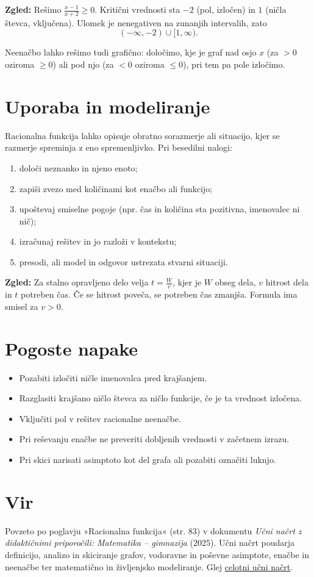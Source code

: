\documentclass[11pt]{article}
\begin{document}
\textbf{Zgled:} Rešimo $\frac{x-1}{x+2}\ge 0$. Kritični vrednosti sta $-2$ (pol, izločen) in $1$ (ničla števca, vključena). Ulomek je nenegativen na zunanjih intervalih, zato
\[
 \boxed{(-\infty,-2)\cup[1,\infty)}.
\]

Neenačbo lahko rešimo tudi grafično: določimo, kje je graf nad osjo $x$ (za $>0$ oziroma $\ge 0$) ali pod njo (za $<0$ oziroma $\le 0$), pri tem pa pole izločimo.

\section{Uporaba in modeliranje}

Racionalna funkcija lahko opisuje obratno sorazmerje ali situacijo, kjer se razmerje spreminja z eno spremenljivko. Pri besedilni nalogi:

\begin{enumerate}[leftmargin=*]
  \item določi neznanko in njeno enoto;
  \item zapiši zvezo med količinami kot enačbo ali funkcijo;
  \item upoštevaj smiselne pogoje (npr. čas in količina sta pozitivna, imenovalec ni nič);
  \item izračunaj rešitev in jo razloži v kontekstu;
  \item presodi, ali model in odgovor ustrezata stvarni situaciji.
\end{enumerate}

\textbf{Zgled:} Za stalno opravljeno delo velja $t=\frac{W}{v}$, kjer je $W$ obseg dela, $v$ hitrost dela in $t$ potreben čas. Če se hitrost poveča, se potreben čas zmanjša. Formula ima smisel za $v>0$.

\section{Pogoste napake}

\begin{itemize}[leftmargin=*]
  \item Pozabiti izločiti ničle imenovalca pred krajšanjem.
  \item Razglasiti krajšano ničlo števca za ničlo funkcije, če je ta vrednost izločena.
  \item Vključiti pol v rešitev racionalne neenačbe.
  \item Pri reševanju enačbe ne preveriti dobljenih vrednosti v začetnem izrazu.
  \item Pri skici narisati asimptoto kot del grafa ali pozabiti označiti luknjo.
\end{itemize}

\section{Vir}

Povzeto po poglavju »Racionalna funkcija« (str. 83) v dokumentu \emph{Učni načrt z didaktičnimi priporočili: Matematika -- gimnazija} (2025). Učni načrt poudarja definicijo, analizo in skiciranje grafov, vodoravne in poševne asimptote, enačbe in neenačbe ter matematično in življenjsko modeliranje. Glej \href{Učni%20načrt%20matematika.pdf}{celotni učni načrt}.
\end{document}
